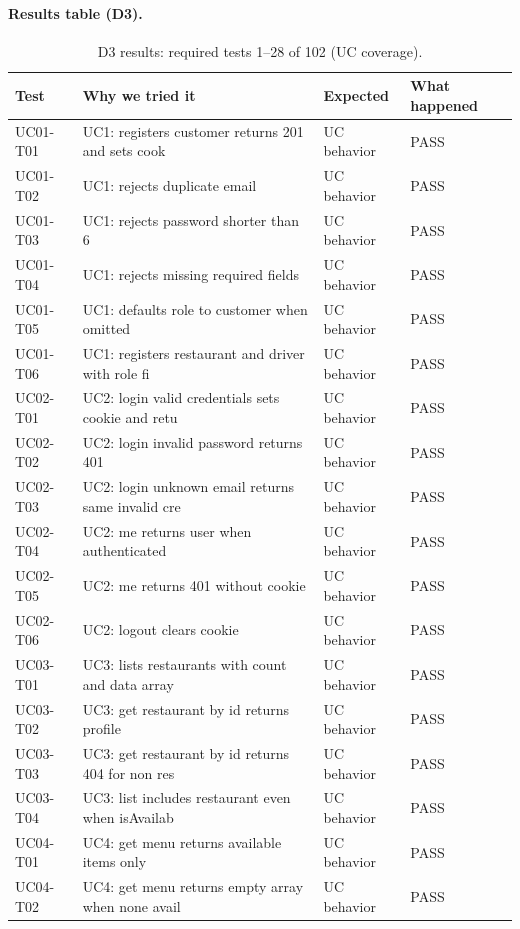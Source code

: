 \paragraph{Results table (D3).}
\begin{table}[t]
\caption{D3 results: required tests 1--28 of 102 (UC coverage).}
\label{tab:d3r1}
\centering\scriptsize
\begin{tabular}{p{3.8cm}p{3.6cm}p{2.8cm}p{2.0cm}}
\toprule
Test & Why we tried it & Expected & What happened \\
\midrule
UC01-T01 & UC1: registers customer returns 201 and sets cook & UC behavior & PASS \\
UC01-T02 & UC1: rejects duplicate email & UC behavior & PASS \\
UC01-T03 & UC1: rejects password shorter than 6 & UC behavior & PASS \\
UC01-T04 & UC1: rejects missing required fields & UC behavior & PASS \\
UC01-T05 & UC1: defaults role to customer when omitted & UC behavior & PASS \\
UC01-T06 & UC1: registers restaurant and driver with role fi & UC behavior & PASS \\
UC02-T01 & UC2: login valid credentials sets cookie and retu & UC behavior & PASS \\
UC02-T02 & UC2: login invalid password returns 401 & UC behavior & PASS \\
UC02-T03 & UC2: login unknown email returns same invalid cre & UC behavior & PASS \\
UC02-T04 & UC2: me returns user when authenticated & UC behavior & PASS \\
UC02-T05 & UC2: me returns 401 without cookie & UC behavior & PASS \\
UC02-T06 & UC2: logout clears cookie & UC behavior & PASS \\
UC03-T01 & UC3: lists restaurants with count and data array & UC behavior & PASS \\
UC03-T02 & UC3: get restaurant by id returns profile & UC behavior & PASS \\
UC03-T03 & UC3: get restaurant by id returns 404 for non res & UC behavior & PASS \\
UC03-T04 & UC3: list includes restaurant even when isAvailab & UC behavior & PASS \\
UC04-T01 & UC4: get menu returns available items only & UC behavior & PASS \\
UC04-T02 & UC4: get menu returns empty array when none avail & UC behavior & PASS \\

\end{tabular}
\end{table}
